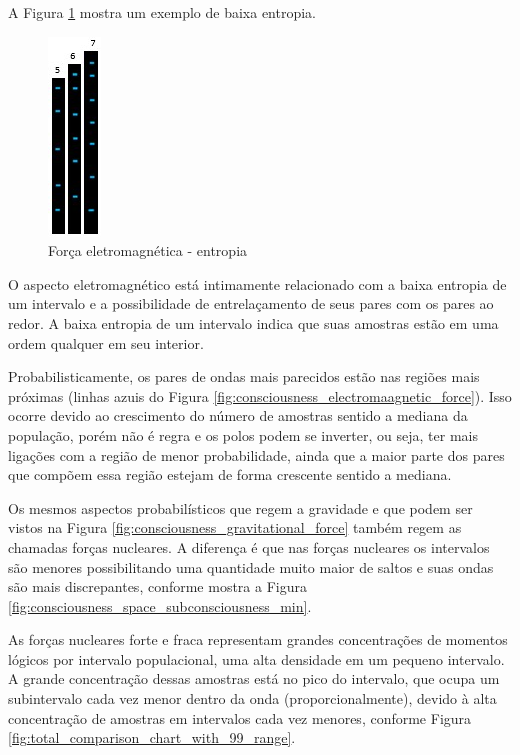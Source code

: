 A Figura \ref{fig:consciousness_electromaagnetic_force_entropy} mostra um exemplo de baixa entropia. 
	\begin{figure}[H]
	\caption{Força eletromagnética - entropia}
	\label{fig:consciousness_electromaagnetic_force_entropy}
	\centering
	\includegraphics[scale=.9]{sections/images/consciousness_electromaagnetic_force_entropy.jpg}
	\end{figure}

O aspecto eletromagnético está intimamente relacionado com a baixa entropia de um intervalo e a possibilidade de entrelaçamento de seus pares com os pares ao redor. A baixa entropia de um intervalo indica que suas amostras estão em uma ordem qualquer em seu interior.

Probabilisticamente, os pares de ondas mais parecidos estão nas regiões mais próximas (linhas azuis do Figura \ref{fig:consciousness_electromaagnetic_force}). Isso ocorre devido ao crescimento do número de amostras sentido a mediana da população, porém não é regra e os polos podem se inverter, ou seja, ter mais ligações com a região de menor probabilidade, ainda que a maior parte dos pares que compõem essa região estejam de forma crescente sentido a mediana.

Os mesmos aspectos probabilísticos que regem a gravidade e que podem ser vistos na Figura \ref{fig:consciousness_gravitational_force} também regem as chamadas forças nucleares. A diferença é que nas forças nucleares os intervalos são menores possibilitando uma quantidade muito maior de saltos e suas ondas são mais discrepantes, conforme mostra a Figura \ref{fig:consciousness_space_subconsciousness_min}.

As forças nucleares forte e fraca representam grandes concentrações de momentos lógicos por intervalo populacional, uma alta densidade em um pequeno intervalo. A grande concentração dessas amostras está no pico do intervalo, que ocupa um subintervalo cada vez menor dentro da onda (proporcionalmente), devido à alta concentração de amostras em intervalos cada vez menores, conforme Figura \ref{fig:total_comparison_chart_with_99_range}.

